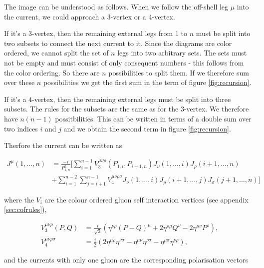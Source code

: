 \documentclass{article}
\theoremstyle{definition}
\numberwithin{equation}{section}
\begin{document}
The image can be understood as follows. When we follow the off-shell leg $\mu$ into the current, we could approach a $3$-vertex or a $4$-vertex.

If it's a $3$-vertex, then the remaining external legs from $1$ to $n$ must be split into two subsets to connect the next current to it. Since the diagrams are color ordered, we cannot split the set of $n$ legs into two arbitrary sets. The sets must not be empty and must consist of only consequent numbers - this follows from the color ordering. So there are $n$ possibilities to split them. If we therefore sum over these $n$ possibilities we get the first sum in the term of figure \ref{fig:recursion}.

If it's a $4$-vertex, then the remaining external legs must be split into three subsets. The rules for the subsets are the same as for the $3$-vertex. We therefore have $n(n-1)$ possitbilities. This can be written in terms of a double sum over two indices $i$ and $j$ and we obtain the second term in figure \ref{fig:recursion}.

Therfore the current can be written as

\begin{equation}
    \begin{split}
        J^{\mu}(1, \dots , n) &= \frac{-i}{P_{1,n}^2} \Biggl[ \sum_{i=1}^{n-1} V_3^{\mu \nu \rho}(P_{1,i}, P_{i+1,n}) J_{\nu}(1, \dots, i) J_{\rho}(i+1, \dots , n) \\
        &+ \sum_{i=1}^{n-2} \sum_{j=i+1}^{n-1} V_4^{\mu \nu \rho \sigma} J_{\nu}(1, \dots, i) J_{\rho}(i+1, \dots, j)J_{\sigma}(j+1, \dots, n) \Biggr] \label{eq:recursion}
    \end{split}
\end{equation}

where the $V_i$ are the colour ordered gluon self interaction vertices (see appendix \ref{sec:cofrules}),

\begin{align}
    V_3^{\mu \nu \rho}(P, Q) &= \frac{i}{\sqrt{2}} \left( \eta^{\nu \rho}\left( P - Q \right)^{\mu} + 2 \eta^{\rho \mu} Q^{\nu} - 2 \eta^{\mu \nu} P^{\rho}  \right), \\
    V_4^{\mu \nu \rho \sigma} &= \frac{i}{2} \left( 2 \eta^{\mu \rho} \eta^{\nu \sigma} - \eta^{\mu \nu} \eta^{\rho \sigma} - \eta^{\mu \sigma} \eta^{\nu \rho}  \right),
\end{align}

and the currents with only one gluon are the corresponding polarisation vectors
\end{document}
